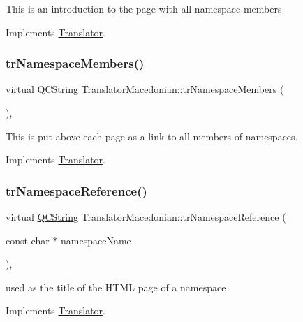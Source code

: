 This is an introduction to the page with all namespace members 

Implements \mbox{\hyperlink{class_translator}{Translator}}.

\mbox{\label{class_translator_macedonian_a77f50a2a3056918742e03f7d82e4a244}} 
\subsubsection{\texorpdfstring{trNamespaceMembers()}{trNamespaceMembers()}}
{\footnotesize\ttfamily virtual \mbox{\hyperlink{class_q_c_string}{Q\+C\+String}} Translator\+Macedonian\+::tr\+Namespace\+Members (\begin{DoxyParamCaption}{ }\end{DoxyParamCaption})\hspace{0.3cm}{\ttfamily [inline]}, {\ttfamily [virtual]}}

This is put above each page as a link to all members of namespaces. 

Implements \mbox{\hyperlink{class_translator}{Translator}}.

\mbox{\label{class_translator_macedonian_a763ac826550ccb123bb968d23ead3aa5}} 
\subsubsection{\texorpdfstring{trNamespaceReference()}{trNamespaceReference()}}
{\footnotesize\ttfamily virtual \mbox{\hyperlink{class_q_c_string}{Q\+C\+String}} Translator\+Macedonian\+::tr\+Namespace\+Reference (\begin{DoxyParamCaption}\item[{const char $\ast$}]{namespace\+Name }\end{DoxyParamCaption})\hspace{0.3cm}{\ttfamily [inline]}, {\ttfamily [virtual]}}

used as the title of the H\+T\+ML page of a namespace 

Implements \mbox{\hyperlink{class_translator}{Translator}}.

